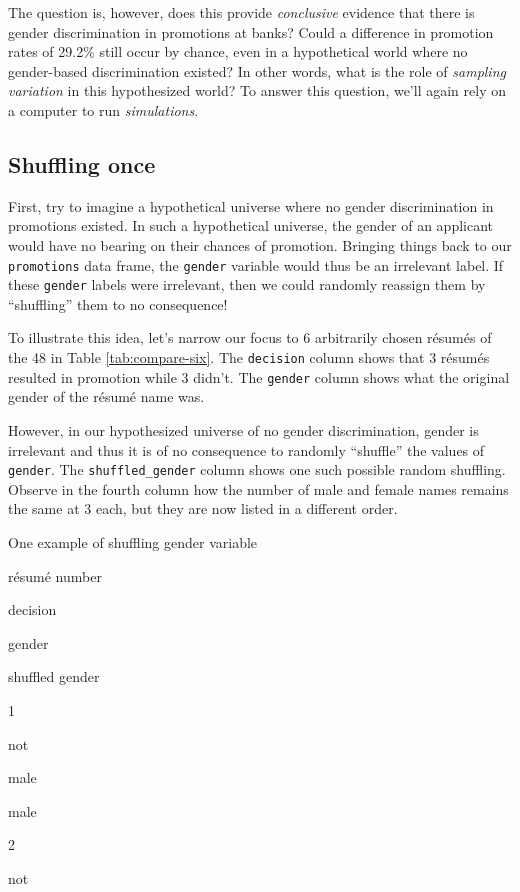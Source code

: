 \documentclass[
]{book}
\begin{document}
The question is, however, does this provide \emph{conclusive} evidence that there is gender discrimination in promotions at banks? Could a difference in promotion rates of 29.2\% still occur by chance, even in a hypothetical world where no gender-based discrimination existed? In other words, what is the role of \emph{sampling variation} in this hypothesized world? To answer this question, we'll again rely on a computer to run \emph{simulations}.

\hypertarget{shuffling-once}{%
\subsection{Shuffling once}\label{shuffling-once}}

First, try to imagine a hypothetical universe where no gender discrimination in promotions existed. In such a hypothetical universe, the gender of an applicant would have no bearing on their chances of promotion. Bringing things back to our \texttt{promotions} data frame, the \texttt{gender} variable would thus be an irrelevant label. If these \texttt{gender} labels were irrelevant, then we could randomly reassign them by ``shuffling'' them to no consequence!

To illustrate this idea, let's narrow our focus to 6 arbitrarily chosen résumés of the 48 in Table \ref{tab:compare-six}. The \texttt{decision} column shows that 3 résumés resulted in promotion while 3 didn't. The \texttt{gender} column shows what the original gender of the résumé name was.

However, in our hypothesized universe of no gender discrimination, gender is irrelevant and thus it is of no consequence to randomly ``shuffle'' the values of \texttt{gender}. The \texttt{shuffled\_gender} column shows one such possible random shuffling. Observe in the fourth column how the number of male and female names remains the same at 3 each, but they are now listed in a different order.

\label{tab:compare-six}One example of shuffling gender variable

résumé number

decision

gender

shuffled gender

1

not

male

male

2

not
\end{document}
